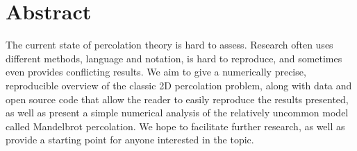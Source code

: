 

\begingroup
\let\clearpage\relax
\let\cleardoublepage\relax
\let\cleardoublepage\relax

\chapter*{Abstract}

The current state of percolation theory is hard to assess. Research often uses different methods, language and notation, is hard to reproduce, and sometimes even provides conflicting results. We aim to give a numerically precise, reproducible overview of the classic 2D percolation problem, along with data and open source code that allow the reader to easily reproduce the results presented, as well as present a simple numerical analysis of the relatively uncommon model called Mandelbrot percolation. We hope to facilitate further research, as well as provide a starting point for anyone interested in the topic.

\endgroup			

\vfill